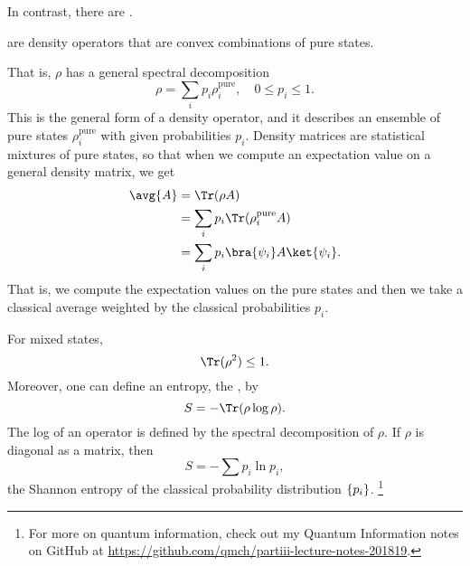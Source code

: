 In contrast, there are .
\begin{defn}
     are density operators that are convex combinations of pure states.
\end{defn}
That is, $\rho$ has a general spectral decomposition
\begin{equation}
    \rho = \sum_i p_i \rho_i^\text{pure}, \quad 0 \leq p_i \leq 1.
\end{equation}
This is the general form of a density operator, and it describes an ensemble of pure states $\rho_i^\text{pure}$ with given probabilities $p_i$. Density matrices are statistical mixtures of pure states, so that when we compute an expectation value on a general density matrix, we get
\begin{align}
    \avg{A} &= \Tr(\rho A)\\
        &= \sum_i p_i \Tr(\rho_i^\text{pure} A)\\
        &= \sum_i p_i \bra{\psi_i} A \ket{\psi_i}.
\end{align}
That is, we compute the expectation values on the pure states and then we take a classical average weighted by the classical probabilities $p_i$.

For mixed states,
\begin{equation}
    \Tr(\rho^2) \leq 1.
\end{equation}
Moreover, one can define an entropy, the , by
\begin{equation}
    S= -\Tr (\rho\log \rho).
\end{equation}
The log of an operator is defined by the spectral decomposition of $\rho$. If $\rho$ is diagonal as a matrix, then
\begin{equation}
    S= -\sum p_i \ln p_i,
\end{equation}
the Shannon entropy of the classical probability distribution $\{p_i\}$.%
    \footnote{For more on quantum information, check out my Quantum Information notes on GitHub at \url{https://github.com/qmch/partiii-lecture-notes-201819}.}

